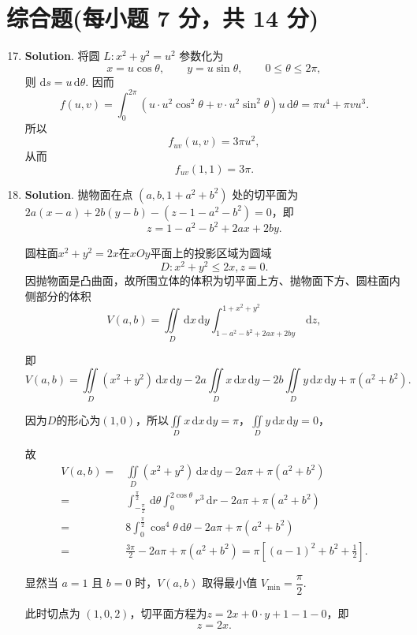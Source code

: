 \documentclass[../Main.tex]{subfiles}
\begin{document}
\section{综合题(每小题 7 分，共 14 分)}
\begin{enumerate}
  \setcounter{enumi}{16}
  \item \textbf{Solution}. 将圆 \(L:x^2+y^2=u^2\) 参数化为
        \[
          x=u\cos\theta,\qquad y=u\sin\theta,\qquad 0\le\theta\le2\pi,
        \]
        则 \(\mathrm{d}s=u\,\mathrm{d}\theta\). 因而
        \[
          f(u,v)=\int_0^{2\pi}\left(u\cdot u^2\cos^2\theta+v\cdot u^2\sin^2\theta\right)u\,\mathrm{d}\theta
          =\pi u^4+\pi vu^3.
        \]
        所以
        \[
          f_{uv}(u,v)=3\pi u^2,
        \]
        从而
        \[
          f_{uv}(1,1)=3\pi.
        \]

  \item \textbf{Solution}. 抛物面在点 \((a,b,1+a^2+b^2)\) 处的切平面为$2a(x-a)+2b(y-b)-(z-1-a^2-b^2)=0$，即
        \[
          z=1-a^2-b^2+2ax+2by.
        \]

        圆柱面$x^2+y^2=2x$在$xOy$平面上的投影区域为圆域
        \[
          D:x^2+y^2\le2x,z=0.
        \]
        因抛物面是凸曲面，故所围立体的体积为切平面上方、抛物面下方、圆柱面内侧部分的体积
        \[
          V(a,b)=\iint\limits_{D}\,\mathrm{d}x\,\mathrm{d}y\int_{1-a^2-b^2+2ax+2by}^{1+x^2+y^2}\,\mathrm{d}z,
        \]

        即
        \[
          V(a,b)=\iint\limits_{D}\left(x^2+y^2\right)\,\mathrm{d}x\,\mathrm{d}y-2a\iint\limits_{D}x\,\mathrm{d}x\,\mathrm{d}y-2b\iint\limits_{D}y\,\mathrm{d}x\,\mathrm{d}y+\pi(a^2+b^2).
        \]

        因为$D$的形心为$(1,0)$，所以$\iint\limits_{D}x\,\mathrm{d}x\,\mathrm{d}y=\pi$，$\iint\limits_{D}y\,\mathrm{d}x\,\mathrm{d}y=0$，

        故
        \[
          \begin{aligned}
            V(a,b)= & \iint\limits_{D}\left(x^2+y^2\right)\,\mathrm{d}x\,\mathrm{d}y-2a\pi+\pi(a^2+b^2)                               \\
            =       & \int_{-\frac{\pi}{2}}^{\frac{\pi}{2}}\,\mathrm{d}\theta\int_0^{2\cos\theta} r^3\,\mathrm{d}r-2a\pi+\pi(a^2+b^2) \\
            =       & 8\int_{0}^{\frac{\pi}{2}}\cos^4\theta\,\mathrm{d}\theta-2a\pi+\pi(a^2+b^2)                                      \\
            =       & \frac{3\pi}{2}-2a\pi+\pi(a^2+b^2)=\pi\left[(a-1)^2+b^2+\frac{1}{2}\right].
          \end{aligned}
        \]

        显然当 \(a=1\) 且 \(b=0\) 时，\(V(a,b)\) 取得最小值 \(V_{\min}=\dfrac{\pi}{2}\).

        此时切点为 \((1,0,2)\)，切平面方程为$z=2x+0\cdot y+1-1-0$，即
        \[
          z=2x.
        \]
\end{enumerate}
\end{document}

